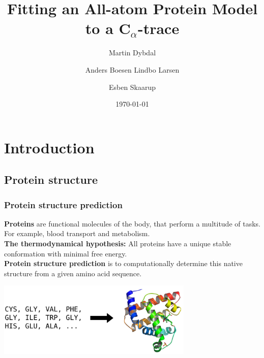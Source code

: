\documentclass{beamer}
\title{Fitting an All-atom Protein Model to a C$_{\alpha}$\hspace*{-.7mm}-trace}
\author{\small Martin Dybdal \and Anders Boesen Lindbo Larsen \and Esben Skaarup}
\institute{\textrm{Department of Computer Science, University of Copenhagen}}
\date{\today}
\begin{document}
\frame{\titlepage}

\section{Introduction}
\subsection{Protein structure}

\begin{frame}[t, fragile]
  \frametitle{Protein structure prediction}
  \textbf{Proteins} are functional molecules of the body, that perform a
    multitude of tasks. For example, blood transport and metabolism.
\\\vspace*{2mm}
\textbf{The thermodynamical hypothesis:} All proteins have a unique
    stable conformation with minimal free energy.
\\\vspace*{2mm}
\textbf{Protein structure prediction} is to computationally
    determine this native structure from a given amino acid sequence.

    \begin{center}
      \includegraphics[width=0.7\textwidth]{psp.pdf}
    \end{center}
\end{frame}
\end{document}
